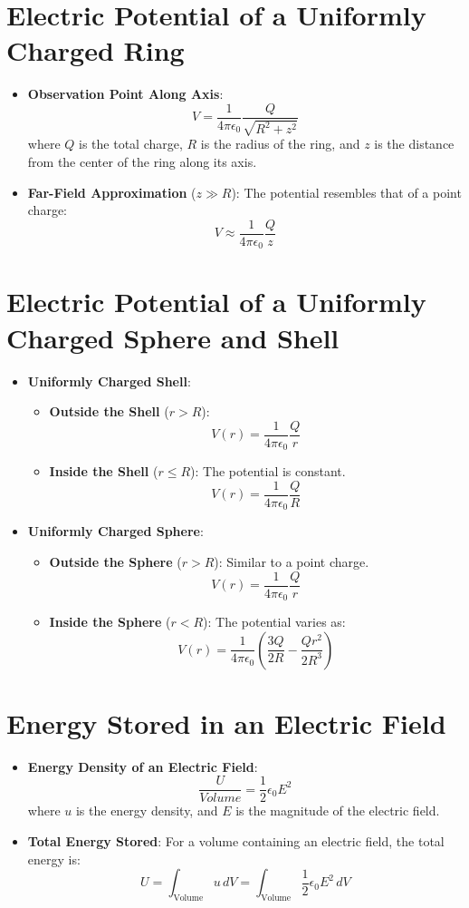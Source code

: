 \documentclass{article}
\begin{document}
\section*{Electric Potential of a Uniformly Charged Ring}
\begin{itemize}
    \item \textbf{Observation Point Along Axis}:
    \[
    V = \frac{1}{4\pi\epsilon_0} \frac{Q}{\sqrt{R^2 + z^2}}
    \]
    where \(Q\) is the total charge, \(R\) is the radius of the ring, and \(z\) is the distance from the center of the ring along its axis.
    \item \textbf{Far-Field Approximation} (\(z \gg R\)): The potential resembles that of a point charge:
    \[
    V \approx \frac{1}{4\pi\epsilon_0} \frac{Q}{z}
    \]
\end{itemize}

\section*{Electric Potential of a Uniformly Charged Sphere and Shell}

\begin{itemize}
    \item \textbf{Uniformly Charged Shell}:
    \begin{itemize}
        \item \textbf{Outside the Shell} (\(r > R\)):
        \[
        V(r) = \frac{1}{4\pi\epsilon_0} \frac{Q}{r}
        \]
        \item \textbf{Inside the Shell} (\(r \leq R\)): The potential is constant.
        \[
        V(r) = \frac{1}{4\pi\epsilon_0} \frac{Q}{R}
        \]
    \end{itemize}
    \item \textbf{Uniformly Charged Sphere}:
    \begin{itemize}
        \item \textbf{Outside the Sphere} (\(r > R\)): Similar to a point charge.
        \[
        V(r) = \frac{1}{4\pi\epsilon_0} \frac{Q}{r}
        \]
        \item \textbf{Inside the Sphere} (\(r < R\)): The potential varies as:
        \[
        V(r) = \frac{1}{4\pi\epsilon_0} \left( \frac{3Q}{2R} - \frac{Q r^2}{2R^3} \right)
        \]
    \end{itemize}
\end{itemize}

\section*{Energy Stored in an Electric Field}
\begin{itemize}
    \item \textbf{Energy Density of an Electric Field}:
    \[
    \frac{U}{Volume} = \frac{1}{2}\epsilon_0 E^2
    \]
    where \(u\) is the energy density, and \(E\) is the magnitude of the electric field.
    \item \textbf{Total Energy Stored}: For a volume containing an electric field, the total energy is:
    \[
    U = \int_{\text{Volume}} u \, dV = \int_{\text{Volume}} \frac{1}{2}\epsilon_0 E^2 \, dV
    \]
\end{itemize}
\end{document}
